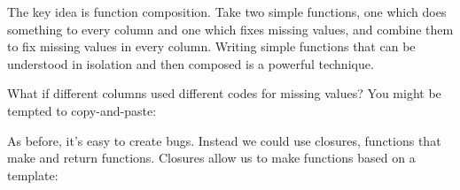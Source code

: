 The key idea is function composition. Take two simple functions, one
which does something to every column and one which fixes missing values,
and combine them to fix missing values in every column. Writing simple
functions that can be understood in isolation and then composed is a
powerful technique.

What if different columns used different codes for missing values? You
might be tempted to copy-and-paste:

\begin{Shaded}
\begin{Highlighting}[]
\StringTok{ }
  \NormalTok{x[x ==}\StringTok{ }\NormalTok{-}\NormalTok{] <-}\StringTok{ }
\NormalTok{\}}
\StringTok{ }
  \NormalTok{x[x ==}\StringTok{ }\NormalTok{-}\NormalTok{] <-}\StringTok{ }
\NormalTok{\}}
\StringTok{ }
  \NormalTok{x[x ==}\StringTok{ }\NormalTok{-}\NormalTok{] <-}\StringTok{ }
\NormalTok{\}}
\end{Highlighting}
\end{Shaded}

As before, it's easy to create bugs. Instead we could use closures,
functions that make and return functions. Closures allow us to make
functions based on a template:

\begin{Shaded}
\begin{Highlighting}[]
\StringTok{ }
    \NormalTok{x[x ==}\StringTok{ }\NormalTok{na_value] <-}\StringTok{ }
  \NormalTok{\}}
\NormalTok{\}}
\StringTok{ }\NormalTok{(-}\NormalTok{)}
\StringTok{ }\NormalTok{(-}\NormalTok{)}

\NormalTok{(}\NormalTok{(-}\NormalTok{, -}\NormalTok{))}
\NormalTok{(}\NormalTok{(-}\NormalTok{, -}\NormalTok{))}
\end{Highlighting}
\end{Shaded}

